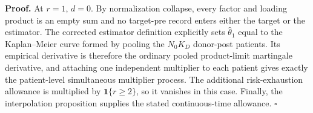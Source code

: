 \textbf{Proof.}
At \(r=1\), \(d=0\).  By normalization collapse, every factor and loading product is an empty sum and no target-pre record enters either the target or the estimator.  The corrected estimator definition explicitly sets \(\widehat\theta_1\) equal to the Kaplan--Meier curve formed by pooling the \(N_0K_D\) donor-post patients.  Its empirical derivative is therefore the ordinary pooled product-limit martingale derivative, and attaching one independent multiplier to each patient gives exactly the patient-level simultaneous multiplier process.  The additional risk-exhaustion allowance is multiplied by \(\mathbf 1\{r\ge2\}\), so it vanishes in this case.  Finally, the interpolation proposition supplies the stated continuous-time allowance. \(\square\)